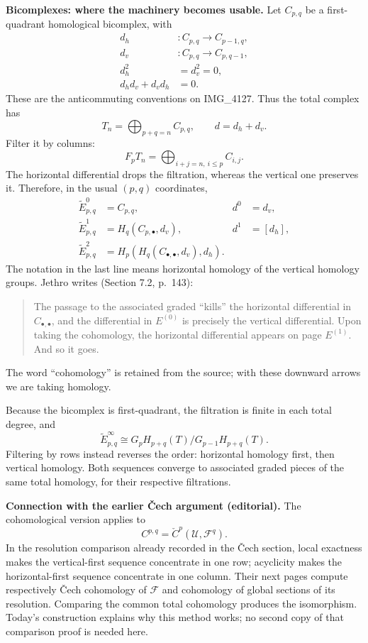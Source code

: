 \medskip\noindent
{\bf Bicomplexes: where the machinery
becomes usable.}
Let $C_{p,q}$ be a first-quadrant
homological bicomplex, with
$$
\begin{aligned}
d_h &: C_{p,q}\to C_{p-1,q},\\
d_v &: C_{p,q}\to C_{p,q-1},\\
d_h^2&=d_v^2=0,\\
d_hd_v+d_vd_h&=0.
\end{aligned}
$$
These are the anticommuting conventions
on IMG\_4127. Thus the total complex has
$$
T_n=\bigoplus_{p+q=n}C_{p,q},
\qquad d=d_h+d_v.
$$
Filter it by columns:
$$
F_pT_n=\bigoplus_{i+j=n,\ i\leq p}C_{i,j}.
$$
The horizontal differential drops the
filtration, whereas the vertical one
preserves it. Therefore, in the usual
$(p,q)$ coordinates,
$$
\begin{aligned}
\widetilde E^0_{p,q}&=C_{p,q},
&d^0&=d_v,\\
\widetilde E^1_{p,q}&=H_q(C_{p,\bullet},d_v),
&d^1&=[d_h],\\
\widetilde E^2_{p,q}&=
H_p(H_q(C_{\bullet,\bullet},d_v),d_h).
\end{aligned}
$$
The notation in the last line means
horizontal homology of the vertical
homology groups. Jethro writes
(Section 7.2, p.~143):
\begin{quote}
The passage to the associated graded
``kills'' the horizontal differential in
$C_{\bullet,\bullet}$, and the differential
in $E^{(0)}$ is precisely the vertical
differential. Upon taking the cohomology,
the horizontal differential appears on
page $E^{(1)}$. And so it goes.
\end{quote}
The word ``cohomology'' is retained from
the source; with these downward arrows
we are taking homology.

Because the bicomplex is first-quadrant,
the filtration is finite in each total
degree, and
$$
\widetilde E^\infty_{p,q}\cong
G_pH_{p+q}(T)/G_{p-1}H_{p+q}(T).
$$
Filtering by rows instead reverses the
order: horizontal homology first, then
vertical homology. Both sequences
converge to associated graded pieces of
the same total homology, for their
respective filtrations.

\medskip\noindent
{\bf Connection with the earlier
\v{C}ech argument (editorial).}
The cohomological version applies to
$$
C^{p,q}=\check C^p(\mathcal U,
\mathcal F^q).
$$
In the resolution comparison already
recorded in the \v{C}ech section, local
exactness makes the vertical-first
sequence concentrate in one row;
acyclicity makes the horizontal-first
sequence concentrate in one column.
Their next pages compute respectively
\v{C}ech cohomology of $\mathcal F$ and
cohomology of global sections of its
resolution. Comparing the common total
cohomology produces the isomorphism.
Today's construction explains why this
method works; no second copy of that
comparison proof is needed here.

